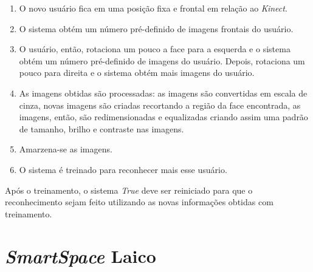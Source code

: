 		\begin{enumerate}
			\item O novo usuário fica em uma posição fixa e frontal em relação ao \textit{Kinect}. 
			\item O sistema obtém um número pré-definido de imagens frontais do usuário.
			\item O usuário, então, rotaciona um pouco a face para a esquerda e o sistema obtém um número pré-definido de imagens do usuário. Depois, rotaciona um pouco para direita e o sistema obtém mais imagens do usuário.
			\item As imagens obtidas são processadas: as imagens são convertidas em escala de cinza, novas imagens são criadas recortando a região da face encontrada, as imagens, então, são redimensionadas e equalizadas criando assim uma padrão de tamanho, brilho e contraste nas imagens.
			\item Amarzena-se as imagens.
			\item O sistema é treinado para reconhecer mais esse usuário.
		\end{enumerate}

	Após o treinamento, o sistema \textit{True} deve ser reiniciado para que o reconhecimento sejam feito utilizando as novas informações obtidas com treinamento.

\section{\textit{SmartSpace} Laico}















